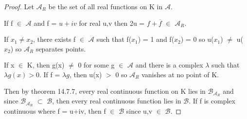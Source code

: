     \begin{proof}
        Let $\mathscr{A}_{R}$ be the set of all real functions on K in $\mathscr{A}$.

        If f $\in$ $\mathscr{A}$ and f = $u+iv$ for real u,v then
        2u = $f + \overline{f}$ $\in$ $\mathscr{A}_R$.

        If $x_1 \not = x_2$, there exists f $\in$ $\mathscr{A}$ such that
        f($x_1$) = 1 and f($x_2$) = 0 so u($x_1$) $\not =$ u($x_2$)
        so $\mathscr{A}_R$ separates points.

        If x $\in$ K, then g(x) $\not =$ 0 for some g $\in$ $\mathscr{A}$
        and there is a complex $\lambda$ such that $\lambda g(x) > 0$.
        If  f = $\lambda g$, then u(x) $>$ 0 so $\mathscr{A}_R$
        vanishes at no point of K.

        Then by {\color{red} theorem 14.7.7}, every real continuous function
        on K lies in $\mathscr{B}_{\mathscr{A}_R}$ and since
        $\mathscr{B}_{\mathscr{A}_R}$ $\subset$ $\mathscr{B}$, then
        every real continuous function lies in $\mathscr{B}$.
        If f is complex continuous where f = u+iv, then f $\in$ $\mathscr{B}$
        since u,v $\in$ $\mathscr{B}$.
    \end{proof}













